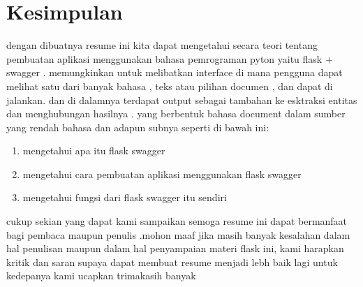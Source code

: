\documentclass[12pt]{article}
\begin{document}
\section{Kesimpulan}
dengan dibuatnya resume ini kita dapat mengetahui secara teori tentang pembuatan aplikasi menggunakan bahasa pemrograman pyton yaitu flask + swagger . 
memungkinkan untuk melibatkan interface di mana pengguna dapat melihat satu dari banyak bahasa , teks atau pilihan documen , dan dapat di jalankan. dan di dalamnya terdapat output sebagai tambahan ke esktraksi entitas dan menghubungan hasilnya . yang berbentuk bahasa document dalam sumber yang rendah bahasa dan adapun subnya seperti di bawah ini:

\begin{enumerate}
\item mengetahui apa itu flask swagger
\item mengetahui cara pembuatan aplikasi menggunakan flask swagger
\item mengetahui fungsi dari flask swagger itu sendiri
\end{enumerate}	
cukup sekian yang dapat kami sampaikan semoga resume ini dapat bermanfaat  bagi pembaca maupun penulis .mohon maaf jika masih banyak kesalahan dalam hal penulisan maupun dalam hal penyampaian materi flask ini, kami harapkan kritik dan saran supaya dapat membuat resume menjadi lebh baik lagi untuk kedepanya kami ucapkan trimakasih banyak
\end{document}
